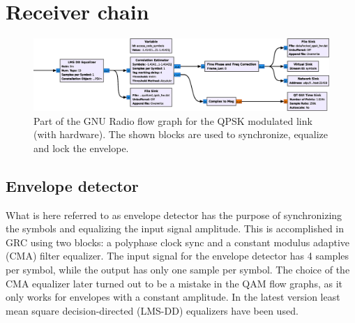 \section{Receiver chain}

\begin{figure}
	\centering
	\includegraphics[width = .95\linewidth]{figures/screenshots/sync_lock}
	\caption{
		Part of the GNU Radio flow graph for the QPSK modulated link (with hardware). The shown blocks are used to synchronize, equalize and lock the envelope.
		\label{fig:sync-lock-flowgraph}
	}
\end{figure}

\subsection{Envelope detector}

What is here referred to as envelope detector has the purpose of synchronizing the symbols and equalizing the input signal amplitude. This is accomplished in GRC using two blocks: a polyphase clock sync and a constant modulus adaptive (CMA) filter equalizer. The input signal for the envelope detector has 4 samples per symbol, while the output has only one sample per symbol. The choice of the CMA equalizer later turned out to be a mistake in the QAM flow graphs, as it only works for envelopes with a constant amplitude. In the latest version least mean square decision-directed (LMS-DD) equalizers have been used.



